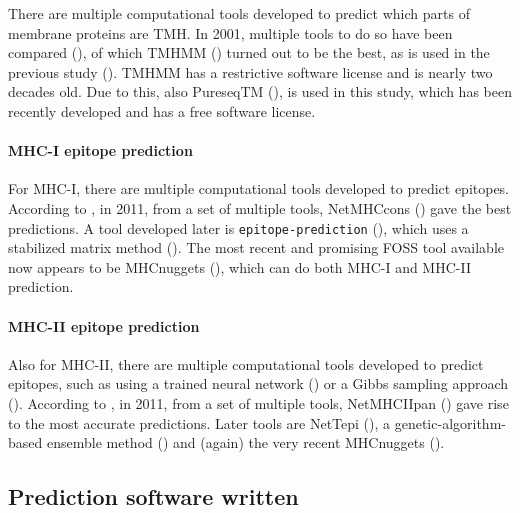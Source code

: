 There are multiple computational tools developed to predict which
parts of membrane proteins are TMH.
In 2001, multiple tools to do so have been compared (\cite{moller2001evaluation}),
of which TMHMM (\cite{krogh2001predicting}) turned out to be the best, 
as is used in the previous study (\cite{bianchi2017}).
TMHMM has a restrictive software license and is nearly two
decades old.
Due to this, also PureseqTM (\cite{wang2019efficient}),
is used in this study, which has been recently developed
and has a free software license.

\paragraph{MHC-I epitope prediction}

For MHC-I, there are multiple computational tools developed 
to predict epitopes. 
According to \cite{lundegaard2011prediction}, in 2011,
from a set of multiple tools, 
NetMHCcons (\cite{karosiene2012netmhccons}) gave the best predictions.
A tool developed later is \verb;epitope-prediction; (\cite{bianchi2017}),
which uses a stabilized matrix method (\cite{kim2009derivation}).
The most recent and promising FOSS tool available now appears
to be MHCnuggets (\cite{shao2020high}), which can do both MHC-I 
and MHC-II prediction.

\paragraph{MHC-II epitope prediction}

Also for MHC-II, there are multiple computational tools developed 
to predict epitopes,
such as using a trained neural network (\cite{nielsen2003reliable})
or a Gibbs sampling approach (\cite{nielsen2004improved}).
According to \cite{lundegaard2011prediction}, in 2011,
from a set of multiple tools, 
NetMHCIIpan (\cite{nielsen2008quantitative,karosiene2013netmhciipan})
gave rise to the most accurate predictions.
Later tools are NetTepi (\cite{trolle2014nettepi}),
a genetic-algorithm-based ensemble method (\cite{zhang2015accurate})
and (again) the very recent MHCnuggets (\cite{shao2020high}).

\subsection{Prediction software written}

